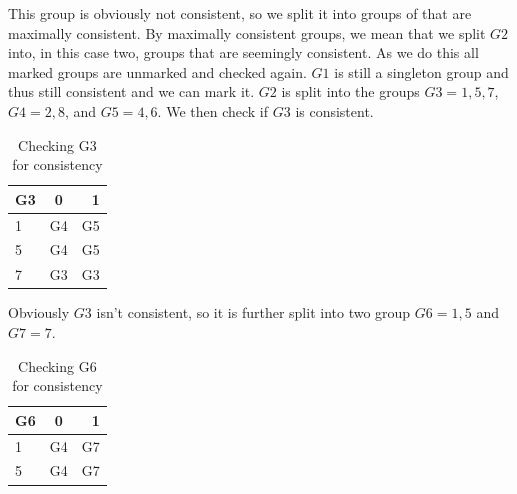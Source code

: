 \documentclass{article}
\begin{document}
This group is obviously not consistent, so we split it into groups of that are maximally consistent. By maximally consistent groups, we mean that we split \(G2\) into, in this case two, groups that are seemingly consistent. As we do this all marked groups are unmarked and checked again. \(G1\) is still a singleton group and thus still consistent and we can mark it. \(G2\) is split into the groups \(G3={1,5,7}\), \(G4={2,8}\), and \(G5={4,6}\). We then check if \(G3\) is consistent.

\begin{table}[h]
	\begin{center}
		\begin{tabular}{|l|c|r|}
			\hline
			G3 & 0 & 1\\\hline
			1 & G4 & G5\\\hline
			5 & G4 & G5\\\hline
			7 & G3 & G3\\\hline
		\end{tabular}
	\caption{Checking G3 for consistency}
	\end{center}
\end{table}

Obviously \(G3\) isn't consistent, so it is further split into two group \(G6={1,5}\) and \(G7={7}\).
\begin{table}[h]
	\begin{center}
		\begin{tabular}{|l|c|r|}
			\hline
			G6 & 0 & 1\\\hline
			1 & G4 & G7\\\hline
			5 & G4 & G7\\\hline
		\end{tabular}
	\caption{Checking G6 for consistency}
	\end{center}
\end{table}
\end{document}

